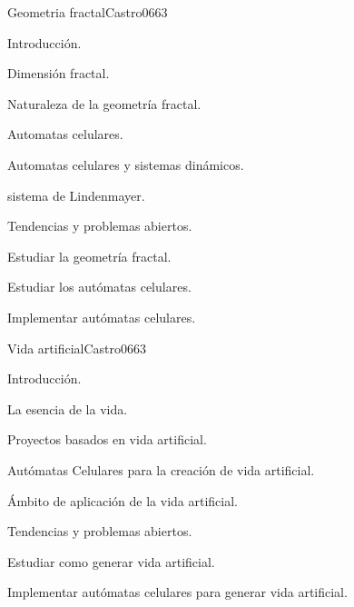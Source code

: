\begin{syllabus}
\begin{unit}{Geometria fractal}{Castro06}{6}{3}
\begin{topics}
        \item Introducción.
        \item Dimensión fractal.
        \item Naturaleza de la geometría fractal.
        \item Automatas celulares.
        \item Automatas celulares y sistemas dinámicos.
        \item sistema de Lindenmayer.
        \item Tendencias y problemas abiertos.
    \end{topics}
    \begin{learningoutcomes}
        \item Estudiar la geometría fractal.
        \item Estudiar los autómatas celulares.
        \item Implementar autómatas celulares.
    \end{learningoutcomes}
\end{unit}

\begin{unit}{Vida artificial}{Castro06}{6}{3}
\begin{topics}
        \item Introducción.
        \item La esencia de la vida.
        \item Proyectos basados en vida artificial.
        \item Autómatas Celulares para la creación de vida artificial.
        \item Ámbito de aplicación de la vida artificial.
        \item Tendencias y problemas abiertos.
    \end{topics}
    \begin{learningoutcomes}
        \item Estudiar como generar vida artificial.
        \item Implementar autómatas celulares para generar vida artificial.
    \end{learningoutcomes}
\end{unit}


\end{syllabus}
